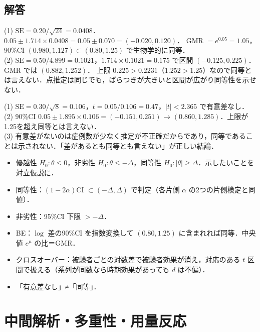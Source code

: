\documentclass[a4paper,11pt,openany]{ltjsbook}
\newenvironment{kaitou}[1]{%
  \par\medskip\noindent
  \begin{tcolorbox}[enhanced,breakable,colback=bkgray!3,colframe=bkgray!60,boxrule=0.4pt,
    left=4pt,right=4pt,top=2pt,bottom=2pt,arc=1pt,
    title={\cref{#1}の解答},fonttitle=\bfseries\small,coltitle=white,colbacktitle=bkgray!80]}%
  {\end{tcolorbox}\par}
\newcommand{\SE}{\mathrm{SE}}
\begin{document}
\section{解答}\label{sec:13-sol}
\begin{kaitou}{reidai:13-1}
(1) $\SE=0.20/\sqrt{24}=0.0408$．$0.05\pm1.714\times0.0408=0.05\pm0.070=(-0.020,0.120)$．
GMR $=e^{0.05}=1.05$，90\%CI $(0.980,1.127)\subset(0.80,1.25)$ で生物学的に同等．\\
(2) $\SE=0.50/4.899=0.1021$，$1.714\times0.1021=0.175$ で区間 $(-0.125,0.225)$．GMR では $(0.882,1.252)$．
上限 $0.225>0.2231$（$1.252>1.25$）なので同等とは言えない．点推定は同じでも，ばらつきが大きいと区間が広がり同等性を示せない．
\end{kaitou}

\begin{kaitou}{reidai:13-2}
(1) $\SE=0.30/\sqrt8=0.106$，$t=0.05/0.106=0.47$，$|t|<2.365$ で有意差なし．\\
(2) 90\%CI $0.05\pm1.895\times0.106=(-0.151,0.251)$ → $(0.860,1.285)$．上限が1.25を超え同等とは言えない．\\
(3) 有意差がないのは症例数が少なく推定が不正確だからであり，同等であることは示されない．「差があるとも同等とも言えない」が正しい結論．
\end{kaitou}

\begin{summarybox}
\begin{itemize}
\item 優越性 $H_0:\theta\le0$，非劣性 $H_0:\theta\le-\Delta$，同等性 $H_0:|\theta|\ge\Delta$．示したいことを対立仮説に．
\item 同等性：$(1-2\alpha)$CI $\subset(-\Delta,\Delta)$ で判定（各片側 $\alpha$ の2つの片側検定と同値）．
\item 非劣性：95\%CI 下限 $>-\Delta$．
\item BE：$\log$ 差の90\%CI を指数変換して $(0.80,1.25)$ に含まれれば同等．中央値 $e^\mu$ の比＝GMR．
\item クロスオーバー：被験者ごとの対数差で被験者効果が消え，対応のある $t$ 区間で扱える（系列が同数なら時期効果があっても $\bar d$ は不偏）．
\item 「有意差なし」≠「同等」．
\end{itemize}
\end{summarybox}

\chapter{中間解析・多重性・用量反応}\label{ch:14}
\end{document}

